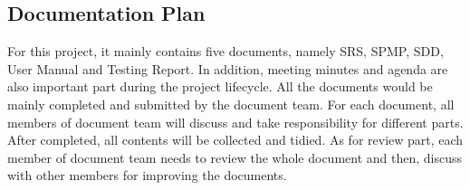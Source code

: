 \documentclass[11pt, a4paper]{article}
\begin{document}
\subsection{Documentation Plan}
For this project, it mainly contains five documents, namely SRS, SPMP, SDD, User Manual and Testing Report. In addition, meeting minutes and agenda are also important part during the project lifecycle. All the documents would be mainly completed and submitted by the document team. For each document, all members of document team will discuss and take responsibility for different parts. After completed, all contents will be collected and tidied. As for review part, each member of document team needs to review the whole document and then, discuss with other members for improving the documents.\\
\end{document}
